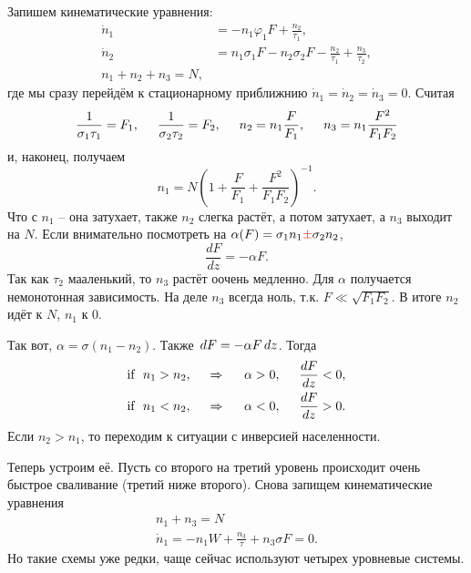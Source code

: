 Запишем кинематические уравнения:
\begin{align*}
    \dot{n}_1 &= - n_1 \varphi_1 F +  \frac{n_2}{\tau_1}, \\
    \dot{n}_2 &= n_1 \sigma_1 F - n_2 \sigma_2 F - \frac{n_2}{\tau_1} + \frac{n_3}{\tau_2}, \\
    n_1 + n_2 + n_3 = N,
\end{align*}
где мы сразу перейдём к стационарному приближнию $\dot{n}_1 = \dot{n}_2 = \dot{n}_3 = 0$. 
Считая
\begin{equation*}
    \frac{1}{\sigma_1 \tau_1} = F_1, \hspace{5 mm} 
    \frac{1}{\sigma_2 \tau_2} = F_2, \hspace{5 mm}
    n_2 = n_1 \frac{F}{F_1}, \hspace{5 mm}
    n_3 = n_1 \frac{F^2}{F_1 F_2}
\end{equation*}
и, наконец, получаем
\begin{equation}
    n_1 = N \left(
        1 + \frac{F}{F_1} + \frac{F^2}{F_1 F_2}
    \right)^{-1}.
\end{equation}
Что с $n_1$ -- она затухает, также $n_2$ слегка растёт, а потом затухает, а $n_3$ выходит на $N$. 
Если внимательно посмотреть на $\alpha (F) = \sigma_1 n_1 \textcolor{red}{\pm} \sigma_2 n_2$,
\begin{equation*}
    \frac{d F}{d z} = - \alpha F.
\end{equation*}
Так как $\tau_2$ мааленький, то $n_3$ растёт оочень медленно. Для $\alpha$ получается немонотонная зависимость. 
На деле $n_3$ всегда ноль, т.к. $F \ll \sqrt{F_1 F_2}$. В итоге $n_2$ идёт к $N$, $n_1$ к 0. 

Так вот, $\alpha = \sigma (n_1 - n_2)$. Также $\, d F = - \alpha F \, d z$. Тогда
\begin{align*}
    \textnormal{if} \ \ n_1 > n_2,
    \hspace{0.5cm} \Rightarrow \hspace{0.5cm}
    \alpha > 0, \hspace{5 mm} \frac{d F}{d z} < 0, \\
    \textnormal{if} \ \ n_1 < n_2,
    \hspace{0.5cm} \Rightarrow \hspace{0.5cm}
    \alpha < 0, \hspace{5 mm} \frac{d F}{d z} > 0.
\end{align*}
Если $n_2 > n_1$, то переходим к ситуации с инверсией населенности. 

Теперь устроим её. Пусть со второго на третий уровень происходит очень быстрое сваливание (третий ниже второго). 
Снова запищем кинематические уравнения
\begin{gather*}
    n_1 + n_3 = N \\
    \dot{n}_1 = - n_1 W + \frac{n_3}{\tau} + n_3 \sigma F = 0.
\end{gather*}
Но такие схемы уже редки, чаще сейчас используют четырех уровневые системы.

